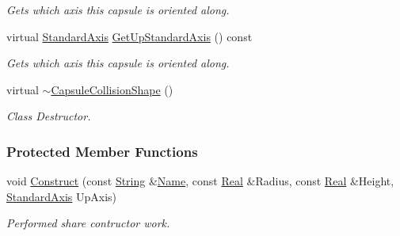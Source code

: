 \begin{DoxyCompactItemize}
\begin{DoxyCompactList}\small\item\em Gets which axis this capsule is oriented along. \item\end{DoxyCompactList}\item 
virtual \hyperlink{namespaceMezzanine_ab41a00a8c6a47b576dc987ec34e16ba1}{StandardAxis} \hyperlink{classMezzanine_1_1CapsuleCollisionShape_ab00e0b036ef4de6d1c663625d0408a4e}{GetUpStandardAxis} () const 
\begin{DoxyCompactList}\small\item\em Gets which axis this capsule is oriented along. \item\end{DoxyCompactList}\item 
\hypertarget{classMezzanine_1_1CapsuleCollisionShape_a197e7425d126ff8b6e7f6da27e0d978c}{
virtual \hyperlink{classMezzanine_1_1CapsuleCollisionShape_a197e7425d126ff8b6e7f6da27e0d978c}{$\sim$CapsuleCollisionShape} ()}
\label{classMezzanine_1_1CapsuleCollisionShape_a197e7425d126ff8b6e7f6da27e0d978c}

\begin{DoxyCompactList}\small\item\em Class Destructor. \item\end{DoxyCompactList}\end{DoxyCompactItemize}
\subsubsection*{Protected Member Functions}
\begin{DoxyCompactItemize}
\item 
void \hyperlink{classMezzanine_1_1CapsuleCollisionShape_a0e4e4f63188053bf72a12ff6a3eef177}{Construct} (const \hyperlink{namespaceMezzanine_acf9fcc130e6ebf08e3d8491aebcf1c86}{String} \&\hyperlink{classMezzanine_1_1CollisionShape_aac524c5c56fa4d158bc071f8aecfbe79}{Name}, const \hyperlink{namespaceMezzanine_a726731b1a7df72bf3583e4a97282c6f6}{Real} \&Radius, const \hyperlink{namespaceMezzanine_a726731b1a7df72bf3583e4a97282c6f6}{Real} \&Height, \hyperlink{namespaceMezzanine_ab41a00a8c6a47b576dc987ec34e16ba1}{StandardAxis} UpAxis)
\begin{DoxyCompactList}\small\item\em Performed share contructor work. \item\end{DoxyCompactList}\end{DoxyCompactItemize}


